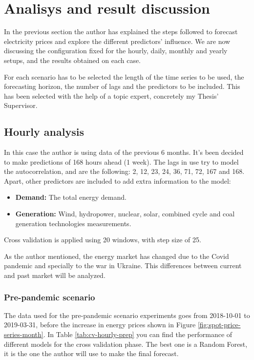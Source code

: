 \chapter{Analisys and result discussion}
In the previous section the author has explained the steps followed to forecast electricity prices and explore the different predictors' influence. We are now discussing the configuration fixed for the hourly, daily, monthly and yearly setups, and the results obtained on each case.

For each scenario has to be selected the length of the time series to be used, the forecasting horizon, the number of lags and the predictors to be included. This has been selected with the help of a topic expert, concretely my Thesis' Supervisor.

\section{Hourly analysis}
In this case the author is using data of the previous 6 months. It's been decided to make predictions of 168 hours ahead (1 week). The lags in use try to model the autocorrelation, and are the following: 2, 12, 23, 24, 36, 71, 72, 167 and 168. Apart, other predictors are included to add extra information to the model:

\begin{itemize}
    \item \textbf{Demand:} The total energy demand.
    \item \textbf{Generation:} Wind, hydropower, nuclear, solar, combined cycle and coal generation technologies measurements.
\end{itemize}

Cross validation is applied using 20 windows, with step size of 25.

As the author mentioned, the energy market has changed due to the Covid pandemic and specially to the war in Ukraine. This differences between current and past market will be analyzed.

\subsection{Pre-pandemic scenario}
The data used for the pre-pandemic scenario experiments goes from 2018-10-01 to 2019-03-31, before the increase in energy prices shown in Figure \ref{fig:spot-price-series-month}. In Table \ref{tab:cv-hourly-prep} you can find the performance of different models for the cross validation phase. The best one is a Random Forest, it is the one the author will use to make the final forecast.


